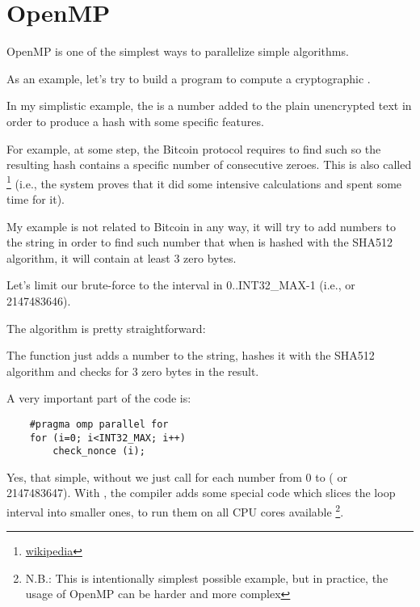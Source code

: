 \section{OpenMP}
\label{openmp}

OpenMP is one of the simplest ways to parallelize simple algorithms.


As an example, let's try to build a program to compute a cryptographic .

In my simplistic example, 
the  is a number added to the plain unencrypted text in order to produce a hash with some specific 
features.

For example, at some step, the Bitcoin protocol requires to find such  so the resulting hash
contains a specific number of consecutive zeroes.
This is also called 
\footnote{\href{http://go.yurichev.com/17101}{wikipedia}} 
(i.e., the system proves that it did some intensive calculations and spent some time for it).

My example is not related to Bitcoin in any way, 
it will try to add numbers to the 
string in order to find such number that when 
 is hashed with the SHA512 algorithm, it will contain at least 3 zero bytes.

Let's limit our brute-force to the interval in
0..INT32\_MAX-1 (i.e.,  or 2147483646).

The algorithm is pretty straightforward:



The  function just adds a number to the string, 
hashes it with the SHA512 algorithm and checks for 3 zero bytes in the result.

A very important part of the code is:

\begin{lstlisting}
	#pragma omp parallel for
	for (i=0; i<INT32_MAX; i++)
		check_nonce (i);
\end{lstlisting}

Yes, that simple, without  
we just call  for each number from 0 to 
 ( or 2147483647).
With , the compiler adds some special 
code which slices the loop interval into smaller ones,
to run them on all \ac{CPU} cores available
\footnote{N.B.: This is intentionally simplest possible
example, but in practice, the usage of OpenMP can be harder and more complex}.

